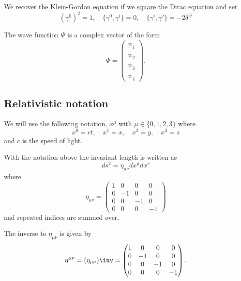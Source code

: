 \documentclass[12pt, a4paper]{article}
\begin{document}
\begin{mdprop}   
    We recover the Klein-Gordon equation if we \ul{square} the Dirac equation and set 
    \[(\gamma^0)^2 = 1, \quad \{\gamma^0, \gamma^i\} = 0, \quad \{\gamma^i, \gamma^j\} = -2\delta^{ij}\]
\end{mdprop} 

\begin{corollary}
    The wave function \(\Psi\) is a complex vector of the form 
    \[\Psi = \begin{pmatrix}
        \psi_1 \\
        \psi_2 \\
        \psi_3 \\
        \psi_4
    \end{pmatrix}.\]
\end{corollary}

\subsection{Relativistic notation}

\begin{definition}
    We will use the following notation, \(x^{\mu}\) with \(\mu \in \{0,1,2,3\}\) where
    \[x^0 = ct, \quad x^1 = x, \quad x^2 = y, \quad x^3 = z\]
    and \(c\) is the speed of light.
\end{definition}

\begin{theorem}
    With the notation above the invariant length is written as 
    \[ds^2 = \eta_{\mu\nu} dx^\mu dx^\nu\]
    where
    \[\eta_{\mu\nu} = \begin{pmatrix}
    1 & 0 & 0 & 0 \\
    0 & -1 & 0 & 0 \\
    0 & 0 & -1 & 0 \\
    0 & 0 & 0 & -1
    \end{pmatrix}\]
    and repeated indices are summed over.
\end{theorem}

\begin{corollary}
    The inverse to \(\eta_{\mu\nu}\) is given by 
    \[\eta^{\mu\nu} = (\eta_{\mu\nu})\inv = \begin{pmatrix}
        1 & 0 & 0 & 0 \\
        0 & -1 & 0 & 0 \\
        0 & 0 & -1 & 0 \\
        0 & 0 & 0 & -1
        \end{pmatrix}.\]
\end{corollary}
\end{document}
